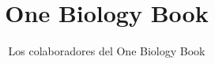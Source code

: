 \documentclass[11pt,a4paper,twoside,openany]{book}
\title{One Biology Book}
\author{Los colaboradores del One Biology Book}
\date{\bookdate}
\begin{document}
\frontmatter




\tableofcontents

\mainmatter



\appendix
\part{\omsolutionspart}


\backmatter
\printindex
\end{document}
